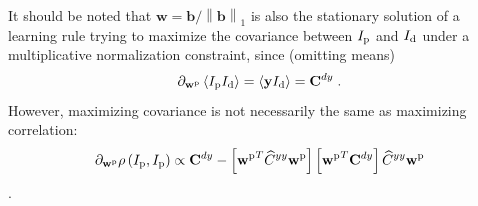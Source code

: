 \documentclass[10pt,a4paper]{article}
\begin{document}
It should be noted that $\mathbf{w} = \mathbf{b} / \left\lVert \mathbf{b} \right\rVert_1$ is also the stationary solution of a learning rule trying to maximize the covariance between $I_{\rm p}$ and $I_{\rm d}$ under a multiplicative normalization constraint, since (omitting means)
\begin{equation}
	\partial_{\mathbf{w}^{\rm p}} \left\langle I_{\rm p}I_{\rm d}\right\rangle = \left\langle \mathbf{y} I_{\rm d} \right\rangle = \mathbf{C}^{dy} \; .
\end{equation}
However, maximizing covariance is not necessarily the same as maximizing correlation:
\begin{equation}
	\partial_{\mathbf{w}^{\rm p}} \rho\left(I_{\rm p},I_{\rm p}\right) \propto \mathbf{C}^{dy} - \left[{\mathbf{w}^{\rm p}}^T \widehat{C}^{yy}{\mathbf{w}^{\rm p}}\right]\left[{\mathbf{w}^{\rm p}}^T \mathbf{C}^{dy} \right] \widehat{C}^{yy}{\mathbf{w}^{\rm p}}
\end{equation} .
%
%
%
\end{document}

